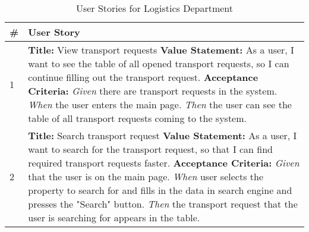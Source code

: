\documentclass[a4paper]{article}
\begin{document}
        
        \begin{longtable}[c]{|p{0.5cm}||p{}|}
             \caption{User Stories for Logistics Department}
        \label{LogisticsDepUserStories} \\
            \hline
             \# & User Story    \\
             \hline
             \endhead
             1 &
                 \textbf{Title:}  View transport requests  \newline
                 \textbf{Value Statement:} As a user, I want to see the table of all opened transport requests, so I can continue filling out the transport request. \newline
                 \textbf{Acceptance Criteria:} \newline
                  \emph{Given} there are transport requests in the system.\newline 
                 \emph{When} the user enters the main page. \newline
                 \emph{Then} the user can see the table of all transport requests coming to the system.
                 
              \\
               \hline
               2 & \textbf{Title:} Search transport request  \newline
                 \textbf{Value Statement:}  As a user, I want to search for the transport request, so that I can find required transport requests faster.  \newline
                 \textbf{Acceptance Criteria:} \newline
                 \emph{Given} that the user is on the main page. \newline 
                 \emph{When} user selects the property to search for and fills in the data in search engine and presses the "Search" button. \newline
                 \emph{Then} the transport request that the user is searching for appears in the table. 
                 

\end{longtable}
\end{document}
